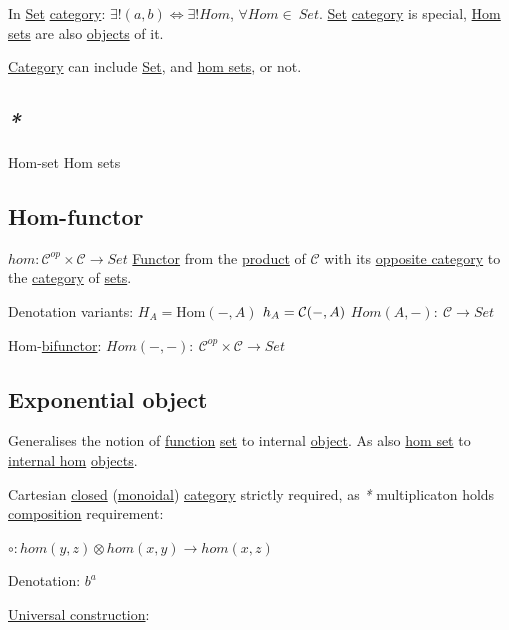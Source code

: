 \documentclass[a4paper,14pt,oneside]{book}
\begin{document}
In \hyperref[org128a409]{Set} \hyperref[orge2e250a]{category}: \(\exists! (a, b) \iff \exists! Hom\), \(\forall Hom \in \ Set\). \hyperref[org128a409]{Set} \hyperref[orge2e250a]{category} is special, \hyperref[org3ba1ef4]{Hom sets} are also \hyperref[orgde02dc0]{objects} of it.

\hyperref[orge2e250a]{Category} can include \hyperref[org128a409]{Set}, and \hyperref[org3ba1ef4]{hom sets}, or not.

\subsection{\emph{*}}
\label{sec:org46b4752}
\label{orgc272614}Hom-set
\label{org3ba1ef4}Hom sets

\subsection{\label{orgf18c636}Hom-functor}
\label{sec:orgad7a22b}
\(hom:\mathcal{C}^{op} \times \mathcal{C} \to Set\)
\hyperref[org61d5270]{Functor} from the \hyperref[org90a2f94]{product} of \(\mathcal{C}\) with its \hyperref[org39e8508]{opposite category} to the \hyperref[orge2e250a]{category} of \hyperref[orgfcb3af7]{sets}.

Denotation variants:
\(H_A = \mathrm{Hom}(-, A)\)
\(h_A = {\cal \mathcal{C}}(-, A)\)
\(Hom(A,-): \ \mathcal{C} \to Set\)

Hom-\hyperref[org3f476fc]{bifunctor}:
\(Hom(-,-): \ \mathcal{C}^{op} \times \mathcal{C} \to Set\)

\subsection{\label{org61bd1f8}Exponential object}
\label{sec:org8882294}
Generalises the notion of \hyperref[org679af45]{function} \hyperref[org128a409]{set} to internal \hyperref[orged022cb]{object}.
As also \hyperref[org03e5c3c]{hom set} to \hyperref[orgc3d97ba]{internal hom} \hyperref[orgde02dc0]{objects}.

Cartesian \hyperref[org1eeda67]{closed} (\hyperref[org6910901]{monoidal}) \hyperref[orge2e250a]{category} strictly required, as \emph{*} multiplicaton holds \hyperref[org1b47f42]{composition} requirement: 

\(\circ:hom(y,z) \otimes hom(x,y) \to hom(x,z)\)

Denotation:
\(b^{a}\)

\hyperref[org0de7840]{Universal construction}:
\end{document}
